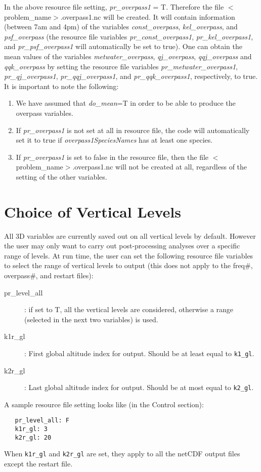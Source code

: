 In the above resource file setting, {\em pr\_overpass1} = T. 
Therefore the file $<$problem\_name$>$.overpass1.nc will be created. 
It will contain information (between 7am and 4pm) of the variables 
{\em const\_overpass}, {\em kel\_overpass}, and {\em psf\_overpass} 
(the resource file variables {\em pr\_const\_overpass1}, {\em pr\_kel\_overpass1}, 
and {\em pr\_psf\_overpass1} will automatically be set to true). 
One can obtain the mean values of the variables {\em metwater\_overpass}, 
{\em qj\_overpass}, {\em qqj\_overpass} and {\em qqk\_overpass} by setting the resource file 
variables {\em pr\_metwater\_overpass1}, {\em pr\_qj\_overpass1},
{\em pr\_qqj\_overpass1}, and {\em pr\_qqk\_overpass1}, respectively, to true.
It is important to note the following:
%
\begin{enumerate}
\item We have assumed that {\em do\_mean}=T in order to be able to produce the 
       overpass variables.
\item If {\em pr\_overpass1} is not set at all in resource file, the code will
      automatically set it to true if {\em overpass1SpeciesNames} has at least one species.
\item If {\em pr\_overpass1} is set to false in the resource file, then
       the file $<$problem\_name$>$.overpass1.nc will not be created at all,
       regardless of the setting of the other variables.
\end{enumerate}

\section{Choice of Vertical Levels}
All 3D variables are currently saved out on all vertical levels by default.
However the user may only want to carry out post-processing
analyses over a specific range of levels.
At run time, the user can set the following resource file variables to select
the range of vertical levels to output (this does not apply to the freq$\#$,
overpass$\#$, and restart files):
%
\begin{description}
\item[pr\_level\_all]: if set to T, all the vertical levels are
   considered, otherwise a range (selected in the next two variables)
   is used.
\item[k1r\_gl]: First global altitude index for output.
   Should be at least equal to {\tt k1\_gl}.
\item[k2r\_gl]: Last global altitude index for output.
   Should be at most equal to {\tt k2\_gl}.
\end{description}
%
A sample resource file setting looks like (in the Control section):
\begin{verbatim}
   pr_level_all: F
   k1r_gl: 3
   k2r_gl: 20
\end{verbatim}
%
When {\tt k1r\_gl} and {\tt k2r\_gl} are set, they apply to all the netCDF output
files except the restart file.
